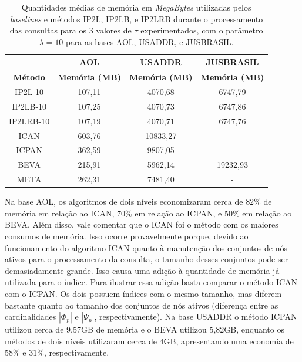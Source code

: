 \begin{table}[h]
\centering
\begin{tabular}{c|c|c|c|}
\cline{2-4}
\multicolumn{1}{l|}{} & \textbf{AOL} & \textbf{USADDR} & \textbf{JUSBRASIL} \\ \hline
\multicolumn{1}{|c|}{\textbf{Método}} & \textbf{Memória (MB)} & \textbf{Memória (MB)} & \textbf{Memória (MB)} \\ \hline
\multicolumn{1}{|c|}{IP2L-10} & 107,11 & 4070,68 & 6747,79 \\ \hline
\multicolumn{1}{|c|}{IP2LB-10} & 107,25 & 4070,73 & 6747,86 \\ \hline
\multicolumn{1}{|c|}{IP2LRB-10} & 107,19 & 4070,71 & 6747,76 \\ \hline
\multicolumn{1}{|c|}{ICAN} & 603,76 & 10833,27 & - \\ \hline
\multicolumn{1}{|c|}{ICPAN} & 362,59 & 9807,05 & - \\ \hline
\multicolumn{1}{|c|}{BEVA} & 215,91 & 5962,14 & 19232,93 \\ \hline
\multicolumn{1}{|c|}{META} & 262,31 & 7481,40 & - \\ \hline
\end{tabular}
\caption{Quantidades médias de memória em \textit{MegaBytes} utilizadas pelos \textit{baselines} e métodos IP2L, IP2LB, e IP2LRB durante o processamento das consultas para os 3 valores de $\tau$ experimentados, com o parâmetro $\lambda=10$ para as bases AOL, USADDR, e JUSBRASIL.}
\label{tab:baselines-memory-consumption}
\end{table}

Na base AOL, os algoritmos de dois níveis economizaram cerca de $82\%$ de memória em relação ao ICAN, $70\%$ em relação ao ICPAN, e $50\%$ em relação ao BEVA. Além disso, vale comentar que o ICAN foi o método com os maiores consumos de memória. Isso ocorre provavelmente porque, devido ao funcionamento do algoritmo ICAN quanto à manutenção dos conjuntos de nós ativos para o processamento da consulta, o tamanho desses conjuntos pode ser demasiadamente grande. Isso causa uma adição à quantidade de memória já utilizada para o índice. Para ilustrar essa adição basta comparar o método ICAN com o ICPAN. Os dois possuem índices com o mesmo tamanho, mas diferem bastante quanto ao tamanho dos conjuntos de nós ativos (diferença entre as cardinalidades $|\Phi_{p}|$ e $|\Psi_{p}|$, respectivamente). Na base USADDR o método ICPAN utilizou cerca de 9,57GB de memória e o BEVA utilizou 5,82GB, enquanto os métodos de dois níveis utilizaram cerca de 4GB, apresentando uma economia de $58\%$ e $31\%$, respectivamente. 

